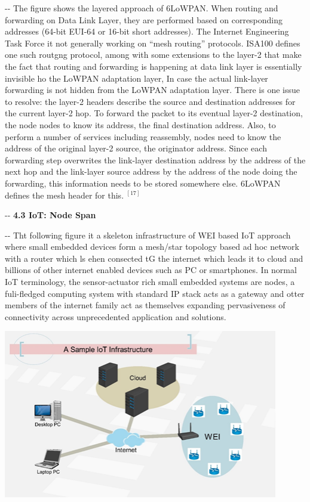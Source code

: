 \documentclass[12pt]{article}
\makeatletter
\newenvironment{indentation}[3]%
	{\par\setlength{\parindent}{#3}
	\setlength{\leftmargin}{#1}       \setlength{\rightmargin}{#2}%
	\advance\linewidth -\leftmargin       \advance\linewidth -\rightmargin%
	\advance\@totalleftmargin\leftmargin  \@setpar{{\@@par}}%
	\parshape 1\@totalleftmargin \linewidth\ignorespaces}{\par}%
\makeatother
\begin{document}
\begin{indentation}{0pt}{0pt}{0pt}
The figure shows the layered approach of 6LoWPAN. When routing and forwarding on
Data Link Layer, they are performed based on corresponding addresses (64-bit
EUI-64 or 16-bit short addresses). The Internet Engineering Task Force it not
generally working on ``mesh routing'' protocols. ISA100 defines one such routgng
protocol, among with some extensions to the layer-2 that make the fact that
routing and forwarding is happening at data link layer is essentially invisible
ho the LoWPAN adaptation layer, In case the actual link-layer forwarding is not
hidden from the LoWPAN adaptation layer. There is one issue to resolve: the
layer-2 headers describe the source and destination addresses for the current
layer-2 hop. To forward the packet to its eventual layer-2 destination, the node
nodes to know its address, the final destination address. Also, to perform a
number of services including reassembly, nodes need to know the address of the
original layer-2 source, the originator address. Since each forwarding step
overwrites the link-layer destination address by the address of the next hop and
the link-layer source address by the address of the node doing the forwarding,
this information needs to be stored somewhere else. 6LoWPAN defines the mesh
header for this.
$^{[17]}$

\end{indentation}
\bigskip
\begin{indentation}{-1pt}{0pt}{0pt}
\textbf{{\large 4.3 IoT: Node Span}}
\end{indentation}
\smallskip
\begin{indentation}{0pt}{0pt}{0pt}
Tht following figure it a skeleton infrastructure of WEI based IoT approach
where small embedded devices form a mesh/star topology based ad hoc network with
a router which ls ehen consected tG the internet which leads it to cloud and
billions of other internet enabled devices such as PC or smartphones. In normal
IoT terminology, the sensor-actuator rich small embedded systems are nodes, a
fuli-fledged computing system with standard IP stack acts as a gateway and otter
members of the internet family act as themselves expanding pervasiveness of
connectivity across unprecedented application and solutions.
\end{indentation}
\includegraphics[width=340pt]{img-6.png}
\end{document}
